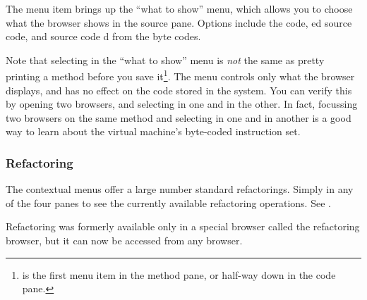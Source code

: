 \documentclass[a4paper,10pt,twoside]{book}
\begin{document}
The  menu item brings up the ``what to show'' menu, which allows you to choose what the browser shows in the source pane.  Options include the  code, ed source code,  and source code d from the byte codes.

Note that selecting  in the ``what to show'' menu is \emph{not} the same as pretty printing a method before you save it\footnote{ is the first menu item in the method pane, or half-way down in the code pane.}.  
The menu controls only what the browser displays, and has no effect on the code stored in the system.  
You can verify this  by opening two browsers, and selecting  in one and  in the other.   
In fact, focussing two browsers on the same method and selecting  in one and  in another is a good way to learn about the \pharo virtual machine's byte-coded instruction set.

\subsubsection{Refactoring}

The contextual menus offer a large number standard refactorings.
Simply \actclick in any of the four panes to see the currently available refactoring operations.
See .

Refactoring was formerly available only in a special browser called the refactoring browser, but it can now be accessed from any browser.
\end{document}
